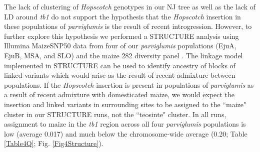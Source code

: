 \documentclass[11pt]{article} %
\begin{document}
\begin{linenumbers}
\begin{flushleft}
The lack of clustering of \emph{Hopscotch} genotypes in our NJ tree as well as the lack of LD around \emph{tb1} do not support the hypothesis that the \emph{Hopscotch} insertion in these populations of \emph{parviglumis} is the result of recent introgression. However, to further explore this hypothesis we performed a STRUCTURE analysis using Illumina MaizeSNP50 data from four of our \emph{parviglumis} populations (EjuA, EjuB, MSA, and SLO) \citep{Pyhajarvi2013} and the maize 282 diversity panel \citep{Cook2012}. 
The linkage model implemented in STRUCTURE can be used to identify ancestry of blocks of linked variants which would arise as the result of recent admixture between populations. If the \emph{Hopscotch} insertion is present in populations of \emph{parviglumis} as a result of recent admixture with domesticated maize, we would expect the insertion and linked variants in surrounding sites to be assigned to the ``maize" cluster in our STRUCTURE runs, not the ``teosinte" cluster. In all runs, assignment to maize in the \emph{tb1} region across all four \emph{parviglumis} populations is low (average 0.017) and much below the chromosome-wide average (0.20; Table \ref{Table4Q}; Fig. \ref{Fig4Structure}). 


\end{flushleft}
\end{linenumbers}
\end{document}
